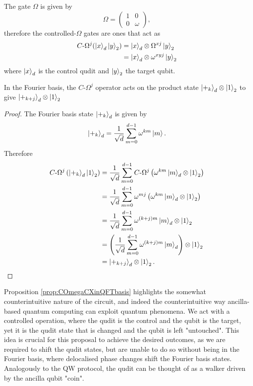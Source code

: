 The gate $\Omega$ is given by
\begin{equation}
    \Omega = 
    \begin{pmatrix}
        1 & 0\\
        0 & \omega
    \end{pmatrix},
\end{equation}
therefore the controlled-$\Omega$ gates are ones that act as 
\begin{align}
    C\text{-}\Omega^j (\ket{x}_d\ket{y}_2) &= \ket{x}_d\otimes \Omega^{xj}\ket{y}_2\\
    & = \ket{x}_d\otimes \omega^{xyj}\ket{y}_2
\end{align}
where $\ket{x}_d$ is the control qudit and $\ket{y}_2$ the target qubit.

\begin{proposition}
    \label{prop:COmegaCXinQFTbasis}
    In the Fourier basis, the $C\text{-}\Omega^j$ operator acts on the product state $\ket{+_k}_d\otimes\ket{1}_2$ to give $\ket{+_{k+j}}_d\otimes\ket{1}_2$
\end{proposition}
\begin{proof}
    The Fourier basis state $\ket{+_k}_d$ is given by
    \begin{equation}
        \ket{+_k}_d = \frac{1}{\sqrt{d}}\sum_{m=0}^{d-1}\omega^{km}\ket{m}.
    \end{equation}
    Therefore
    \begin{align}
        C\text{-}\Omega^j\left(\ket{+_k}_d\ket{1}_2\right) 
        &= \frac{1}{\sqrt{d}}\sum_{m=0}^{d-1}C\text{-}\Omega^j\left(\omega^{km}\ket{m}_d\otimes\ket{1}_2\right)\\
        &= \frac{1}{\sqrt{d}}\sum_{m=0}^{d-1}\omega^{mj}\left(\omega^{km}\ket{m}_d\otimes\ket{1}_2\right)\\
        &= \frac{1}{\sqrt{d}}\sum_{m=0}^{d-1}\omega^{(k+j)m}\ket{m}_d\otimes\ket{1}_2\\
        &= \left(\frac{1}{\sqrt{d}}\sum_{m=0}^{d-1}\omega^{(k+j)m}\ket{m}_d\right)\otimes\ket{1}_2\\
        &= \ket{+_{k+j}}_d\otimes\ket{1}_2.
    \end{align}
\end{proof}

Proposition \ref{prop:COmegaCXinQFTbasis} highlights the somewhat counterintuitive nature of the circuit, and indeed the counterintuitive way ancilla-based quantum computing can exploit quantum phenomena.
We act with a controlled operation, where the qudit is the control and the qubit is the target, yet it is the qudit state that is changed and the qubit is left "untouched".
This idea is crucial for this proposal to achieve the desired outcomes, as we are required to shift the qudit states, but are unable to do so without being in the Fourier basis, where delocalised phase changes shift the Fourier basis states.
Analogously to the QW protocol, the qudit can be thought of as a walker driven by the ancilla qubit "coin".

